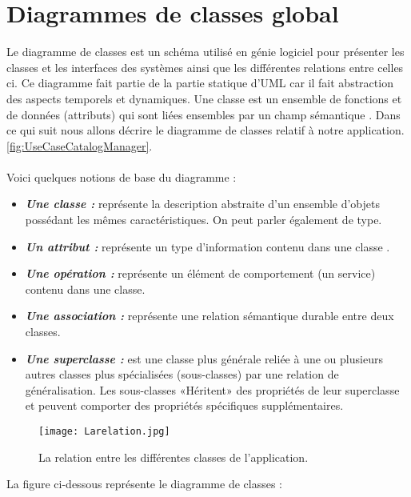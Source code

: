 \section{Diagrammes de classes global}
Le diagramme de classes est un schéma utilisé en génie logiciel pour présenter les classes et les interfaces des systèmes ainsi que les différentes relations entre celles ci. Ce diagramme fait
partie de la partie statique d’UML car il fait abstraction des aspects temporels et dynamiques.
Une classe est un ensemble de fonctions et de données (attributs) qui sont liées ensembles par un champ sémantique . Dans ce qui suit nous allons décrire le diagramme de classes relatif à notre application.
 \ref{fig:UseCaseCatalogManager}. \\
 \\Voici quelques notions de base du diagramme :
  \begin{itemize}
 	\item \textit{\textbf{Une classe :}}  représente la description abstraite d'un ensemble d'objets
 	possédant les mêmes caractéristiques. On peut parler également de type. 
 	
 	\item \textit{\textbf{Un attribut :}} représente un type d'information contenu dans une classe .
 	
 	\item \textit{\textbf{Une opération  :}} représente un élément de comportement (un service)
 	contenu dans une classe.
 	
 
 	\item \textit{\textbf{Une association   :}} représente une relation sémantique durable entre deux
 	classes.
 	
 	\item \textit{\textbf{Une superclasse :}}
 	 est une classe plus générale reliée à une ou plusieurs
 	autres classes plus spécialisées (sous-classes) par une relation de
 	généralisation. Les sous-classes «Héritent» des propriétés de leur
 	superclasse et peuvent comporter des propriétés spécifiques
 	supplémentaires.
 	\end{itemize}
 \begin{figure}[ht]
 	\centering
 	\texttt{[image: Larelation.jpg]}
 	\caption{ La relation entre les différentes classes de l'application.}
 	\label{fig: La relation entre les différentes classes de l'application}
 \end{figure}
 \FloatBarrier
 \clearpage 
 La figure ci-dessous représente le diagramme de classes \cite{wiki:Diagramme_de_classes}:
 	
